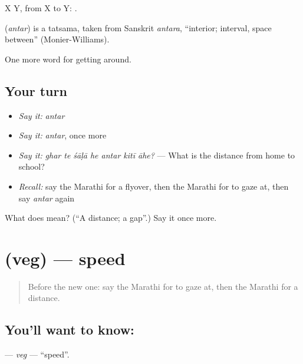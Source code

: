 X  Y, from X to Y:   .

\begin{cousinweb}
\textbf{} (\emph{antar}) is a tatsama, taken from Sanskrit \emph{antara}, \textquotedblleft{}interior; interval, space between\textquotedblright{} (Monier-Williams).
\end{cousinweb}

\begin{grammarlens}[title={What you've built}]
One more word for getting around.
\end{grammarlens}

\subsection*{Your turn}
\begin{itemize}
\raggedright
  \item \emph{Say it:} \emph{antar}
  \item \emph{Say it:} \emph{antar}, once more
  \item \emph{Say it:} \emph{ghar te śāḷā he antar kitī āhe?} — What is the distance from home to school?
  \item \emph{Recall:} say the Marathi for a flyover, then the Marathi for to gaze at, then say \emph{antar} again
\end{itemize}

\begin{tcolorbox}[breakable,colback=teal!4,colframe=teal!35!black,title={Before you move on}]
What does  mean? (\textquotedblleft{}A distance; a gap\textquotedblright{}.) Say it once more.
\end{tcolorbox}
\section[\texorpdfstring{\mr{वेग} (veg)}{वेग (veg)}]{ (veg) — speed}

\label{lesson:MR-C407-veg}



\begin{quote}
Before the new one: say the Marathi for to gaze at, then the Marathi for a distance.
\end{quote}

\subsection*{You'll want to know: }
\textbf{} — \emph{veg} — \textquotedblleft{}speed\textquotedblright{}.


